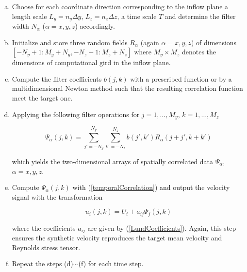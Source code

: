 \begin{enumerate}[(a)]

\item Choose for each coordinate direction corresponding to the inflow plane a length scale $L_y = n_y\varDelta y$, $L_z = n_z\varDelta z$, a time scale $T$ and determine the filter width $N_{\alpha}$ ($\alpha =x,y,z$) accordingly.

\item Initialize and store three random fields $R_{\alpha}$ (again $\alpha =x,y,z$) of dimensions $[-N_y+1:M_y+N_y,-N_z+1:M_z+N_z]$ where $M_y \times M_z$ denotes the dimensions of computational gird in the inflow plane.

\item Compute the filter coefficients $b(j,k)$ with a prescribed function or by a multidimensional Newton method such that the resulting correlation function meet the target one.

\item Applying the following filter operations for $j=1,\ldots,M_y$, $k=1,\ldots,M_z$

\begin{equation}
\varPsi_{\alpha}(j,k) = \sum_{j'=-N_y}^{N_y}\sum_{k'=-N_z}^{N_z}b(j',k')R_{\alpha}(j+j',k+k')
\end{equation}

\noindent which yields the two-dimensional arrays of spatially correlated data $\varPsi_{\alpha}$, $\alpha =x,y,z$.

\item Compute $\Psi_{\alpha}(j,k)$ with (\ref{temporalCorrelation}) and output the velocity signal with the transformation

\begin{equation}
u_i(j,k) = U_i + a_{ij}\Psi_j(j,k)
\end{equation}

\noindent where the coefficients $a_{ij}$ are given by (\ref{LundCoefficients}). Again, this step ensures the synthetic velocity reproduces the target mean velocity and Reynolds stress tensor.

\item Repeat the steps (d)$\sim$(f) for each time step.

\end{enumerate}
